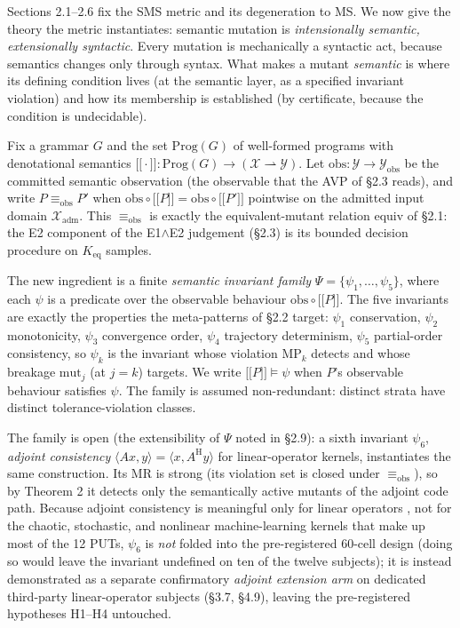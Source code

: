 \documentclass[manuscript,screen,review]{acmart}
\begin{document}
Sections 2.1--2.6 fix the SMS metric and its degeneration to MS. We now
give the theory the metric instantiates: semantic mutation is
\emph{intensionally semantic, extensionally syntactic}. Every mutation
is mechanically a syntactic act, because semantics changes only through
syntax. What makes a mutant \emph{semantic} is where its defining
condition lives (at the semantic layer, as a specified invariant
violation) and how its membership is established (by certificate,
because the condition is undecidable).

Fix a grammar $G$ and the set $\mathrm{Prog}(G)$ of well-formed programs
with denotational semantics
$\mathopen{\lbrack\!\lbrack}\cdot\mathclose{\rbrack\!\rbrack} : \mathrm{Prog}(G) \to (\mathcal{X} \rightharpoonup \mathcal{Y})$.
Let $\mathrm{obs} : \mathcal{Y} \to \mathcal{Y}_{\mathrm{obs}}$ be the committed
semantic observation (the observable that the AVP of §2.3 reads), and
write $P \equiv_{\mathrm{obs}} P'$ when
$\mathrm{obs} \circ \mathopen{\lbrack\!\lbrack} P \mathclose{\rbrack\!\rbrack} = \mathrm{obs} \circ \mathopen{\lbrack\!\lbrack} P' \mathclose{\rbrack\!\rbrack}$
pointwise on the admitted input domain $\mathcal{X}_{\mathrm{adm}}$.
This $\equiv_{\mathrm{obs}}$ is exactly the equivalent-mutant relation
$\mathrm{equiv}$ of §2.1: the E2 component of the E1$\wedge$E2 judgement
(§2.3) is its bounded decision procedure on $K_{\mathrm{eq}}$ samples.

The new ingredient is a finite \emph{semantic invariant family}
$\Psi = \{\psi_1, \dots, \psi_5\}$, where each $\psi$ is a predicate over
the observable behaviour $\mathrm{obs} \circ \mathopen{\lbrack\!\lbrack} P \mathclose{\rbrack\!\rbrack}$. The five
invariants are exactly the properties the meta-patterns of §2.2 target:
$\psi_1$ conservation, $\psi_2$ monotonicity, $\psi_3$ convergence order,
$\psi_4$ trajectory determinism, $\psi_5$ partial-order consistency, so
$\psi_k$ is the invariant whose violation MP$_k$ detects and whose
breakage $\mathrm{mut}_j$ (at $j=k$) targets. We write
$\mathopen{\lbrack\!\lbrack} P \mathclose{\rbrack\!\rbrack} \models \psi$ when $P$'s observable behaviour
satisfies $\psi$. The family is assumed non-redundant: distinct strata
have distinct tolerance-violation classes.

The family is open (the extensibility of $\Psi$ noted in §2.9): a sixth
invariant $\psi_6$, \emph{adjoint consistency}
$\langle A x, y\rangle = \langle x, A^{\mathrm{H}} y\rangle$ for
linear-operator kernels, instantiates the same construction. Its MR is
strong (its violation set is closed under $\equiv_{\mathrm{obs}}$), so by Theorem
2 it detects only the semantically active mutants of the adjoint code
path. Because adjoint consistency is meaningful only for linear operators
, not for the chaotic, stochastic, and nonlinear machine-learning
kernels that make up most of the 12 PUTs, $\psi_6$ is \emph{not} folded
into the pre-registered 60-cell design (doing so would leave the invariant
undefined on ten of the twelve subjects); it is instead demonstrated as a
separate confirmatory \emph{adjoint extension arm} on dedicated
third-party linear-operator subjects (§3.7, §4.9), leaving the
pre-registered hypotheses H1--H4 untouched.
\end{document}
